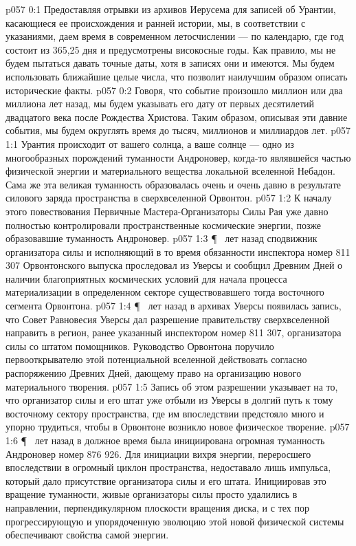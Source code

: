 \author{Носитель Жизни}
\vs p057 0:1 Предоставляя отрывки из архивов Иерусема для записей об Урантии, касающиеся ее происхождения и ранней истории, мы, в соответствии с указаниями, даем время в современном летосчислении --- по календарю, где год состоит из 365,25 дня и предусмотрены високосные годы. Как правило, мы не будем пытаться давать точные даты, хотя в записях они и имеются. Мы будем использовать ближайшие целые числа, что позволит наилучшим образом описать исторические факты.
\vs p057 0:2 Говоря, что событие произошло миллион или два миллиона лет назад, мы будем указывать его дату от первых десятилетий двадцатого века после Рождества Христова. Таким образом, описывая эти давние события, мы будем округлять время до тысяч, миллионов и миллиардов лет.
\vs p057 1:1 Урантия происходит от вашего солнца, а ваше солнце --- одно из многообразных порождений туманности Андроновер, когда\hyp{}то являвшейся частью физической энергии и материального вещества локальной вселенной Небадон. Сама же эта великая туманность образовалась очень и очень давно в результате силового заряда пространства в сверхвселенной Орвонтон.
\vs p057 1:2 К началу этого повествования Первичные Мастера\hyp{}Организаторы Силы Рая уже давно полностью контролировали пространственные космические энергии, позже образовавшие туманность Андроновер.
\vs p057 1:3 \P\  лет назад сподвижник организатора силы и исполняющий в то время обязанности инспектора номер 811 307 Орвонтонского выпуска проследовал из Уверсы и сообщил Древним Дней о наличии благоприятных космических условий для начала процесса материализации в определенном секторе существовавшего тогда восточного сегмента Орвонтона.
\vs p057 1:4 \P\  лет назад в архивах Уверсы появилась запись, что Совет Равновесия Уверсы дал разрешение правительству сверхвселенной направить в регион, ранее указанный инспектором номер 811 307, организатора силы со штатом помощников. Руководство Орвонтона поручило первооткрывателю этой потенциальной вселенной действовать согласно распоряжению Древних Дней, дающему право на организацию нового материального творения.
\vs p057 1:5 Запись об этом разрешении указывает на то, что организатор силы и его штат уже отбыли из Уверсы в долгий путь к тому восточному сектору пространства, где им впоследствии предстояло много и упорно трудиться, чтобы в Орвонтоне возникло новое физическое творение.
\vs p057 1:6 \P\  лет назад в должное время была инициирована огромная туманность Андроновер номер 876 926. Для инициации вихря энергии, переросшего впоследствии в огромный циклон пространства, недоставало лишь импульса, который дало присутствие организатора силы и его штата. Инициировав это вращение туманности, живые организаторы силы просто удалились в направлении, перпендикулярном плоскости вращения диска, и с тех пор прогрессирующую и упорядоченную эволюцию этой новой физической системы обеспечивают свойства самой энергии.
